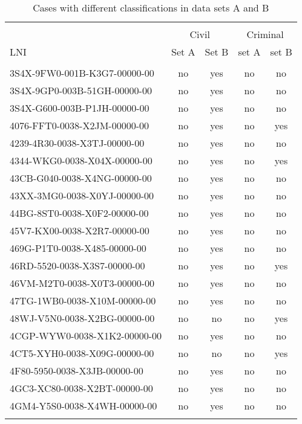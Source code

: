 \documentclass[10pt, letterpaper]{article}
\begin{document}
\begin{spacing}{1.0}
\begin{table}[H]
    \centering
    \caption{Cases with different classifications in data sets A and B}
    \begin{tabular}{lcccc}
        \hline\\[-6pt]
        & \multicolumn{2}{c}{Civil} & \multicolumn{2}{c}{Criminal}\\
        LNI & Set A & Set B & set A & set B\\[4pt]
        \hline\\[-6pt]
        3S4X-9FW0-001B-K3G7-00000-00 & no & yes & no & no\\
        3S4X-9GP0-003B-51GH-00000-00 & no & yes & no & no\\
        3S4X-G600-003B-P1JH-00000-00 & no & yes & no & no\\
        4076-FFT0-0038-X2JM-00000-00 & no & yes & no & yes\\
        4239-4R30-0038-X3TJ-00000-00 & no & yes & no & no\\
        4344-WKG0-0038-X04X-00000-00 & no & yes & no & yes\\
        43CB-G040-0038-X4NG-00000-00 & no & yes & no & no\\
        43XX-3MG0-0038-X0YJ-00000-00 & no & yes & no & no\\
        44BG-8ST0-0038-X0F2-00000-00 & no & yes & no & no\\
        45V7-KX00-0038-X2R7-00000-00 & no & yes & no & no\\
        469G-P1T0-0038-X485-00000-00 & no & yes & no & no\\
        46RD-5520-0038-X3S7-00000-00 & no & yes & no & yes\\
        46VM-M2T0-0038-X0T3-00000-00 & no & yes & no & no\\
        47TG-1WB0-0038-X10M-00000-00 & no & yes & no & no\\
        48WJ-V5N0-0038-X2BG-00000-00 & no & no & no & yes\\
        4CGP-WYW0-0038-X1K2-00000-00 & no & yes & no & no\\
        4CT5-XYH0-0038-X09G-00000-00 & no & no & no & yes\\
        4F80-5950-0038-X3JB-00000-00 & no & yes & no & no\\
        4GC3-XC80-0038-X2BT-00000-00 & no & yes & no & no\\
        4GM4-Y5S0-0038-X4WH-00000-00 & no & yes & no & no\\[4pt]
        \hline\\
    \end{tabular}
    \label{tab:diffCaseType}
\end{table}


\end{spacing}
\end{document}
